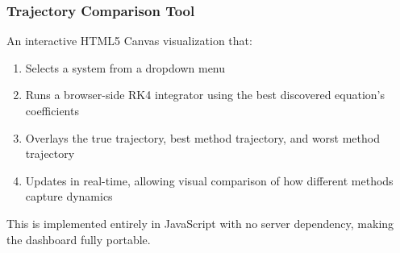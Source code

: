 \subsubsection{Trajectory Comparison Tool}
An interactive HTML5 Canvas visualization that:
\begin{enumerate}
    \item Selects a system from a dropdown menu
    \item Runs a browser-side RK4 integrator using the best discovered equation's coefficients
    \item Overlays the true trajectory, best method trajectory, and worst method trajectory
    \item Updates in real-time, allowing visual comparison of how different methods capture dynamics
\end{enumerate}
This is implemented entirely in JavaScript with no server dependency, making the dashboard fully portable.
